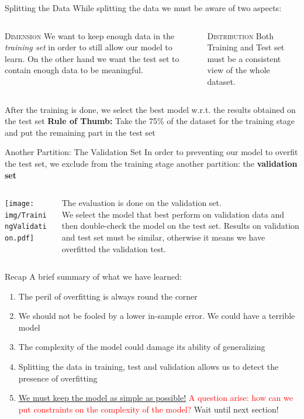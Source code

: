 \documentclass{beamer}
\begin{document}
\begin{frame}{Splitting the Data}
While splitting the data we must be aware of two aspects:
\vskip 1cm
\begin{columns}
\begin{column}{0.5\textwidth}
\textsc{Dimension} We want to keep enough data in the \textit{training set} in order
to still allow our model to learn. On the other hand we want the test set to contain
enough data to be meaningful.
\end{column}
\begin{column}{0.5\textwidth}

\textsc{Distribution} Both Training and Test set must be a consistent view of the whole dataset.
\end{column}
\end{columns}
\vskip 1cm
\pause
After the training is done, we select the best model w.r.t. the results obtained on the test set
\vskip 0.5cm
\textbf{Rule of Thumb:} Take the 75\% of the dataset for the training stage and put the remaining
part in the test set
\end{frame}

\begin{frame}{Another Partition: The Validation Set}
In order to preventing our model to overfit the test set, we exclude from the training stage another partition:
the \textbf{validation set}
\vskip 0.3cm
\begin{columns}
\begin{column}{0.5\textwidth}
\texttt{[image: img/TrainingValidation.pdf]}
\end{column}
\begin{column}{0.5\textwidth}
The evaluation is done on the validation set. \\
We select the model that best perform on validation data and then 
double-check the model on the test set.
\vskip 0.3cm
Results on validation and test set must be similar, otherwise it means we have
overfitted the validation test.
\end{column}
\end{columns}
\end{frame}


\begin{frame}{Recap}
A brief summary of what we have learned:
\begin{enumerate}
\pause
\item The peril of overfitting is always round the corner
\pause
\item We should not be fooled by a lower in-sample error. We could have a terrible model
\pause
\item The complexity of the model could damage its ability of generalizing
\pause
\item Splitting the data in training, test and validation allows us to detect the presence of overfitting
\pause
\item \underline{We must keep the model as simple as possible!} 
\pause \textcolor{red}{A question arise: how can we put constraints on the complexity of the model?}
\pause
Wait until next section!
\end{enumerate}
\end{frame}
\end{document}
